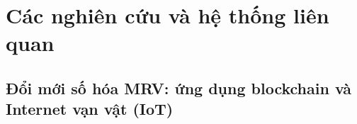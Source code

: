 %
%
%
%

\section{Các nghiên cứu và hệ thống liên quan}
\label{sec:lienquan}

\subsection{Đổi mới số hóa MRV: ứng dụng blockchain và Internet vạn vật (IoT)}
\label{sec:dmrv}

